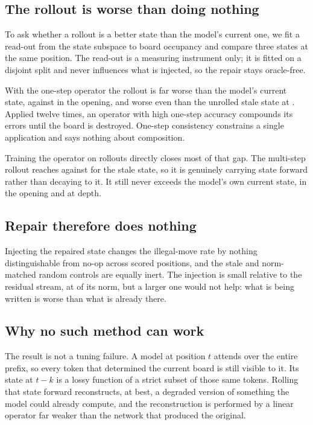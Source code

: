 \documentclass[11pt]{article}
\begin{document}
\subsection{The rollout is worse than doing nothing}



To ask whether a rollout is a better state than the model's current one, we fit a
read-out from the state subspace to board occupancy and compare three states at
the same position. The read-out is a measuring instrument only; it is fitted on a
disjoint split and never influences what is injected, so the repair stays
oracle-free.

With the one-step operator the rollout is far worse than the model's current
state,  against  in the
opening, and worse even than the unrolled stale state at
. Applied twelve times, an operator with high one-step
accuracy compounds its errors until the board is destroyed. One-step consistency
constrains a single application and says nothing about composition.

Training the operator on rollouts directly closes most of that gap. The
multi-step rollout reaches  against
 for the stale state, so it is genuinely carrying
state forward rather than decaying to it. It still never exceeds the model's own
current state,  in the opening and
 at depth.

\subsection{Repair therefore does nothing}



Injecting the repaired state changes the illegal-move rate by nothing
distinguishable from no-op across  scored positions, and the
stale and norm-matched random controls are equally inert. The injection is small
relative to the residual stream, at  of its norm, but a
larger one would not help: what is being written is worse than what is already
there.

\subsection{Why no such method can work}

The result is not a tuning failure. A model at position $t$ attends over the
entire prefix, so every token that determined the current board is still visible
to it. Its state at $t-k$ is a lossy function of a strict subset of those same
tokens. Rolling that state forward reconstructs, at best, a degraded version of
something the model could already compute, and the reconstruction is performed by
a linear operator far weaker than the network that produced the original.
\end{document}
